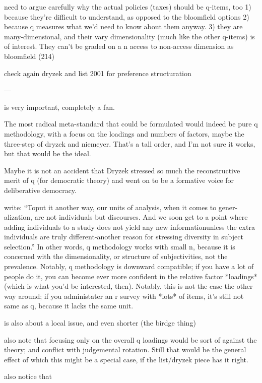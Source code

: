 need to argue carefully why the actual policies (taxes) should be q-items, too
1) because they're difficult to understand, as opposed to the bloomfield options
2) because q measures what we'd need to know about them anyway.
3) they are many-dimensional, and their vary dimensionality (much like the other q-items) is of interest. They can't be graded on a n access to non-access dimension as bloomfield (214)

check again dryzek and list 2001 for preference structuration

---

\cite{Dryzek1993} is very important, completely a fan.

The most radical meta-standard that could be formulated would indeed be pure q methodology, with a focus on the loadings and numbers of factors, maybe the three-step of dryzek and niemeyer. That's a tall order, and I'm not sure it works, but that would be the ideal.

Maybe it is not an accident that Dryzek stressed so much the reconstructive merit of q (for democratic theory) and went on to be a formative voice for deliberative democracy.

\cite[52]{Dryzek1993} write: ``Toput it another way, our units of analysis, when it comes to gener- alization, are not individuals but discourses. And we soon get to a point where adding individuals to a study does not yield any new informationunless the extra individuals are truly different-another reason for stressing diversity in subject selection.''
In other words, q methodology works with small n, because it is concerned with the dimensionality, or structure of subjectivities, not the prevalence. Notably, q methodology is downward compatible; if you have a lot of people do it, you can become ever more confident in the relative factor *loadings* (which is what you'd be interested, then). Notably, this is not the case the other way around; if you administater an r survey with *lots* of items, it's still not same as q, because it lacks the same unit.

\cite{Niemeyer2013} is also about a local issue, and even shorter (the birdge thing)

also note that focusing only on the overall q loadings would be sort of against the theory; and conflict with judgemental rotation. Still that would be the general effect of which this might be a special case, if the list/dryzek piece has it right.

also notice that
